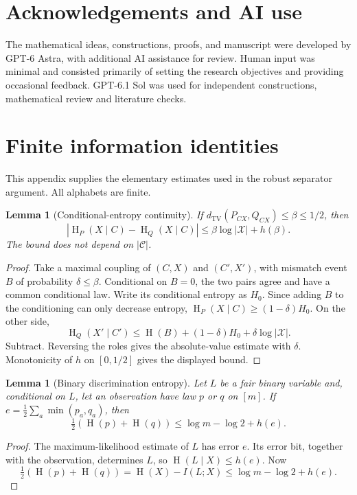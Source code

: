 \documentclass[11pt,reqno]{amsart}
\numberwithin{equation}{section}
\newtheorem{lemma}[theorem]{Lemma}
\theoremstyle{definition}
\theoremstyle{remark}
\newcommand{\TV}{d_{\mathrm{TV}}}
\DeclareMathOperator{\Ent}{H}
\begin{document}

\section*{Acknowledgements and AI use}
The mathematical ideas, constructions, proofs, and manuscript were developed by GPT-6 Astra, with additional AI assistance for review. Human input was minimal and consisted primarily of setting the research objectives and providing occasional feedback. GPT-6.1 Sol was used for independent constructions, mathematical review and literature checks.
\appendix

\section{Finite information identities}\label{app:entropy}
This appendix supplies the elementary estimates used in the robust separator argument. All alphabets are finite.

\begin{lemma}[Conditional-entropy continuity]\label{lem:conditionalcontinuity}
If \(\TV(P_{CX},Q_{CX})\le\beta\le1/2\), then
\[
 |\Ent_P(X\mid C)-\Ent_Q(X\mid C)|
 \le\beta\log|\mathcal X|+h(\beta).
\]
The bound does not depend on \(|\mathcal C|\).
\end{lemma}
\begin{proof}
Take a maximal coupling of \((C,X)\) and \((C',X')\), with mismatch event \(B\) of probability \(\delta\le\beta\). Conditional on \(B=0\), the two pairs agree and have a common conditional law. Write its conditional entropy as \(H_0\). Since adding \(B\) to the conditioning can only decrease entropy,
\(\Ent_P(X\mid C)\ge(1-\delta)H_0\).
On the other side,
\[
 \Ent_Q(X'\mid C')
 \le\Ent(B)+(1-\delta)H_0+\delta\log|\mathcal X|.
\]
Subtract. Reversing the roles gives the absolute-value estimate with \(\delta\). Monotonicity of \(h\) on \([0,1/2]\) gives the displayed bound.
\end{proof}

\begin{lemma}[Binary discrimination entropy]\label{lem:binary}
Let \(L\) be a fair binary variable and, conditional on \(L\), let an observation have law \(p\) or \(q\) on \([m]\). If \(e=\frac12\sum_a\min(p_a,q_a)\), then
\[
 \tfrac12(\Ent(p)+\Ent(q))
 \le\log m-\log2+h(e).
\]
\end{lemma}
\begin{proof}
The maximum-likelihood estimate of \(L\) has error \(e\). Its error bit, together with the observation, determines \(L\), so
\(\Ent(L\mid X)\le h(e)\).
Now
\[
 \tfrac12(\Ent(p)+\Ent(q))
 =\Ent(X)-I(L;X)
 \le\log m-\log2+h(e).
\]
\end{proof}
\end{document}
